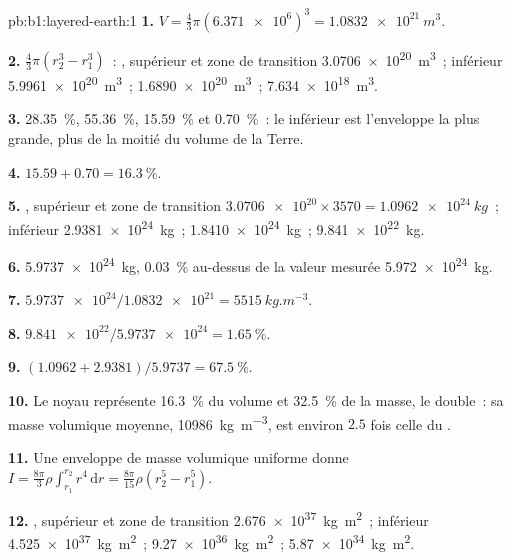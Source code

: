 \begin{solution}{pb:b1:layered-earth:1}
\textbf{1.} $V = \tfrac43\pi(\num{6.371e6})^3 = \qty{1.0832e21}{m^3}$.

\textbf{2.} $\tfrac43\pi(r_2^3 - r_1^3)$~: ,  supérieur et zone de
transition \qty{3.0706e20}{m^3}~;  inférieur \qty{5.9961e20}{m^3}~;  \qty{1.6890e20}{m^3}~;  \qty{7.634e18}{m^3}.

\textbf{3.} \qty{28.35}{\percent}, \qty{55.36}{\percent}, \qty{15.59}{\percent}
et \qty{0.70}{\percent}~: le  inférieur est l'enveloppe la plus grande, plus
de la moitié du volume de la Terre.

\textbf{4.} $15.59 + 0.70 = \qty{16.3}{\percent}$.

\textbf{5.} ,  supérieur et zone de transition $\num{3.0706e20}\times3570 =
\qty{1.0962e24}{kg}$~;  inférieur \qty{2.9381e24}{kg}~; 
\qty{1.8410e24}{kg}~;  \qty{9.841e22}{kg}.

\textbf{6.} \qty{5.9737e24}{kg}, \qty{0.03}{\percent} au-dessus de la valeur mesurée
\qty{5.972e24}{kg}.

\textbf{7.} $\num{5.9737e24}/\num{1.0832e21} = \qty{5515}{kg.m^{-3}}$.

\textbf{8.} $\num{9.841e22}/\num{5.9737e24} = \qty{1.65}{\percent}$.

\textbf{9.} $(1.0962 + 2.9381)/5.9737 = \qty{67.5}{\percent}$.

\textbf{10.} Le noyau représente \qty{16.3}{\percent} du volume et
\qty{32.5}{\percent} de la masse, le double~: sa masse volumique moyenne,
\qty{10986}{kg.m^{-3}}, est environ $2.5$ fois celle du .

\textbf{11.} Une enveloppe de masse volumique uniforme donne
$I = \tfrac{8\pi}{3}\rho\int_{r_1}^{r_2} r^4\,\mathrm dr = \tfrac{8\pi}{15}\rho
(r_2^5 - r_1^5)$.

\textbf{12.} ,  supérieur et zone de transition \qty{2.676e37}{kg.m^2}~;  inférieur
\qty{4.525e37}{kg.m^2}~;  \qty{9.27e36}{kg.m^2}~; 
\qty{5.87e34}{kg.m^2}.


\end{solution}
